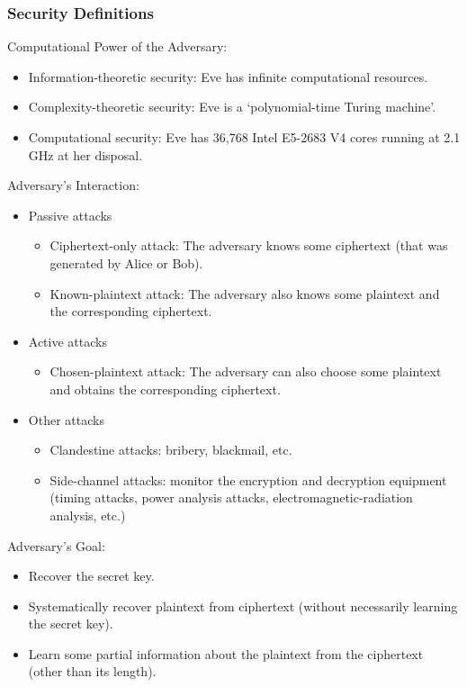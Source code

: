 \documentclass[12pt,titlepage]{article}
\begin{document}
\subsubsection{Security Definitions}
Computational Power of the Adversary: \begin{itemize}
\item Information-theoretic security: Eve has infinite computational resources.
\item Complexity-theoretic security: Eve is a ‘polynomial-time Turing machine’.
\item Computational security: Eve has 36,768 Intel E5-2683 V4 cores running at 2.1 GHz at her disposal.
\end{itemize}

Adversary’s Interaction: \begin{itemize}
\item Passive attacks\begin{itemize}
\item Ciphertext-only attack: The adversary knows some ciphertext (that was generated by Alice or Bob).
\item Known-plaintext attack: The adversary also knows some plaintext and the corresponding ciphertext.
\end{itemize}
\item Active attacks\begin{itemize}
\item Chosen-plaintext attack: The adversary can also choose some plaintext and obtains the corresponding ciphertext.
\end{itemize}
\item Other attacks\begin{itemize}
\item Clandestine attacks: bribery, blackmail, etc.
\item Side-channel attacks: monitor the encryption and decryption equipment (timing attacks, power analysis attacks, electromagnetic-radiation analysis, etc.)
\end{itemize}
\end{itemize}

Adversary’s Goal: \begin{itemize}
\item Recover the secret key.
\item Systematically recover plaintext from ciphertext (without necessarily learning the secret key).
\item Learn some partial information about the plaintext from the ciphertext (other than its length).
\end{itemize}
\end{document}
